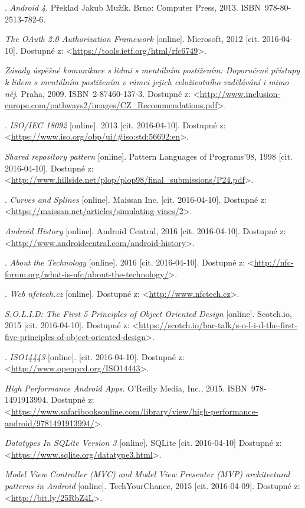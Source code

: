 \documentclass[czech,master,public,dept460,male,java,cpdeclaration]{diploma}
\begin{document}
\begin{thebibliography}{99}
.
\textit{Android 4}. Překlad Jakub Mužík. Brno: Computer Press, 2013. ISBN~978-80-2513-782-6.

\textit{The OAuth 2.0 Authorization Framework} [online]. {Microsoft, 2012 [cit. 2016-04-10].
Dostupné z: <\url{https://tools.ietf.org/html/rfc6749}>.}

\textit{Zásady úspěšné komunikace s lidmi s mentálním postižením: Doporučené přístupy k lidem
s mentálním postižením v rámci jejich celoživotního vzdělávání i mimo něj}. {Praha, 2009}. ISBN~2-87460-137-3.
Dostupné z: <\url{http://www.inclusion-europe.com/pathways2/images/CZ_Recommendations.pdf}>.

.
\textit{ISO/IEC 18092} [online]. 2013 [cit. 2016-04-10].
Dostupné z: <\url{https://www.iso.org/obp/ui/#iso:std:56692:en}>.

\textit{Shared repository pattern} [online]. {Pattern Languages of Programs'98, 1998} [cit. 2016-04-10].
Dostupné z: <\url{http://www.hillside.net/plop/plop98/final_submissions/P24.pdf}>.

.
\textit{Curves and Splines} [online]. Maissan Inc. [cit. 2016-04-10].
Dostupné z: <\url{https://maissan.net/articles/simulating-vines/2}>.

\textit{Android History} [online]. {Android Central, 2016} [cit. 2016-04-10].
Dostupné z: <\url{http://www.androidcentral.com/android-history}>.

.
\textit{About the Technology} [online]. 2016 [cit. 2016-04-10].
Dostupné z: <\url{http://nfc-forum.org/what-is-nfc/about-the-technology/}>.

.
\textit{Web nfctech.cz} [online]. {
Dostupné z: <\url{http://www.nfctech.cz}>.}

\textit{S.O.L.I.D: The First 5 Principles of Object Oriented Design} [online]. {Scotch.io, 2015} [cit. 2016-04-10].
Dostupné z: <\url{https://scotch.io/bar-talk/s-o-l-i-d-the-first-five-principles-of-object-oriented-design}>.

.
\textit{ISO14443} [online]. [cit. 2016-04-10].
Dostupné z: <\url{http://www.openpcd.org/ISO14443}>.

\textit{High Performance Android Apps}. {O'Reilly Media, Inc., 2015}. ISBN~978-1491913994.
Dostupné z: <\url{https://www.safaribooksonline.com/library/view/high-performance-android/9781491913994/}>.

\textit{Datatypes In SQLite Version 3} [online]. {SQLite [cit. 2016-04-10]
Dostupné z: <\url{https://www.sqlite.org/datatype3.html}>.}

\textit{Model View Controller (MVC) and Model View Presenter (MVP) architectural patterns in Android} [online].
{TechYourChance, 2015} [cit. 2016-04-09].
Dostupné z: <\url{http://bit.ly/25RbZ4L}>.


\end{thebibliography}
\end{document}
